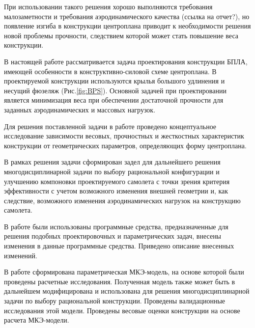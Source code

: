 При использовании такого решения хорошо выполняются требования малозаметности и требования аэродинамического качества (ссылка на отчет?), но появление изгиба в конструкции центроплана приводит к необходимости решения новой проблемы прочности, следствием которой может стать повышение веса конструкции. 

В настоящей работе рассматривается задача проектирования конструкции БПЛА, имеющей особенности в конструктивно-силовой схеме центроплана. В проектируемой конструкции используются крылья большого удлинения и несущий фюзеляж (Рис.\ref{fig:BPS}). Основной задачей при проектировании является минимизация веса при обеспечении достаточной прочности для заданных аэродинамических и массовых нагрузок.








Для решения поставленной задачи в работе проведено концептуальное исследование зависимости весовых, прочностных и жесткостных характеристик конструкции от геометрических параметров, определяющих форму центроплана.


В рамках решения задачи сформирован задел для дальнейшего решения многодисциплинарной задачи по выбору рациональной конфигурации и улучшению компоновки проектируемого самолета с точки зрения критерия эффективности с учетом возможного изменения внешней геометрии и, как следствие, возможного изменения аэродинамических нагрузок на конструкцию самолета. 

В работе были использованы программные средства, предназначенные для решения подобных проектировочных и параметрических задач, внесены изменения в данные программные средства. Приведено описание внесенных изменений.  

В работе сформирована параметрическая МКЭ-модель, на основе которой были проведены расчетные исследования. Полученная модель также может быть в дальнейшем модифицирована и использована для решения многодисциплинарной задачи по выбору рациональной конструкции. Проведены валидационные исследования этой модели. Проведены весовые оценки конструкции на основе расчета МКЭ-модели.   

 